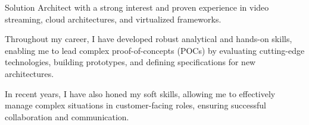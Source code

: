 \par{
    Solution Architect with a strong interest and proven experience in video streaming, cloud architectures, and virtualized frameworks.

    Throughout my career, I have developed robust analytical and hands-on skills, enabling me to lead complex proof-of-concepts (POCs) by evaluating cutting-edge technologies, building prototypes, and defining specifications for new architectures.
    
    In recent years, I have also honed my soft skills, allowing me to effectively manage complex situations in customer-facing roles, ensuring successful collaboration and communication. 
}
